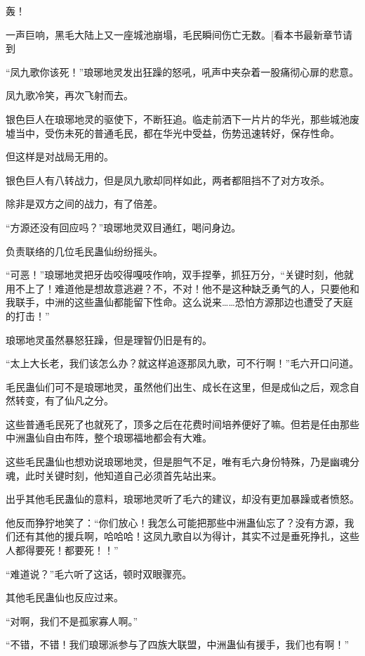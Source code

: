 
\begin{this_body}

轰！

一声巨响，黑毛大陆上又一座城池崩塌，毛民瞬间伤亡无数。[看本书最新章节请到

“凤九歌你该死！”琅琊地灵发出狂躁的怒吼，吼声中夹杂着一股痛彻心扉的悲意。

凤九歌冷笑，再次飞射而去。

银色巨人在琅琊地灵的驱使下，不断狂追。临走前洒下一片片的华光，那些城池废墟当中，受伤未死的普通毛民，都在华光中受益，伤势迅速转好，保存性命。

但这样是对战局无用的。

银色巨人有八转战力，但是凤九歌却同样如此，两者都阻挡不了对方攻杀。

除非是双方之间的战力，有了倍差。

“方源还没有回应吗？”琅琊地灵双目通红，喝问身边。

负责联络的几位毛民蛊仙纷纷摇头。

“可恶！”琅琊地灵把牙齿咬得嘎吱作响，双手捏拳，抓狂万分，“关键时刻，他就用不上了！难道他是想故意逃避？不，不对！他不是这种缺乏勇气的人，只要他和我联手，中洲的这些蛊仙都能留下性命。这么说来……恐怕方源那边也遭受了天庭的打击！”

琅琊地灵虽然暴怒狂躁，但是理智仍旧是有的。

“太上大长老，我们该怎么办？就这样追逐那凤九歌，可不行啊！”毛六开口问道。

毛民蛊仙们可不是琅琊地灵，虽然他们出生、成长在这里，但是成仙之后，观念自然转变，有了仙凡之分。

这些普通毛民死了也就死了，顶多之后在花费时间培养便好了嘛。但若是任由那些中洲蛊仙自由布阵，整个琅琊福地都会有大难。

这些毛民蛊仙也想劝说琅琊地灵，但是胆气不足，唯有毛六身份特殊，乃是幽魂分魂，此时关键时刻，他知道自己必须首先站出来。

出乎其他毛民蛊仙的意料，琅琊地灵听了毛六的建议，却没有更加暴躁或者愤怒。

他反而狰狞地笑了：“你们放心！我怎么可能把那些中洲蛊仙忘了？没有方源，我们还有其他的援兵啊，哈哈哈！这凤九歌自以为得计，其实不过是垂死挣扎，这些人都得要死！都要死！！”

“难道说？”毛六听了这话，顿时双眼骤亮。

其他毛民蛊仙也反应过来。

“对啊，我们不是孤家寡人啊。”

“不错，不错！我们琅琊派参与了四族大联盟，中洲蛊仙有援手，我们也有啊！”


\end{this_body}
